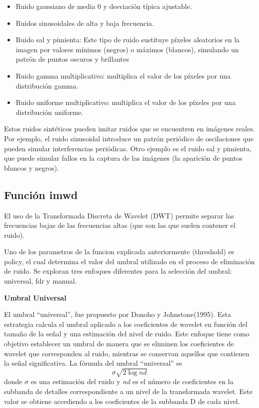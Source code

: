 \documentclass[
]{article}
\providecommand{\tightlist}{%
  \setlength{\itemsep}{0pt}\setlength{\parskip}{0pt}}
\begin{document}
\begin{itemize}
\tightlist
\item
  Ruido gaussiano de media 0 y desviación típica ajustable.
\item
  Ruidos sinusoidales de alta y baja frecuencia.
\item
  Ruido sal y pimienta: Este tipo de ruido sustituye píxeles aleatorios
  en la imagen por valores mínimos (negros) o máximos (blancos),
  simulando un patrón de puntos oscuros y brillantes
\item
  Ruido gamma multiplicativo: multiplica el valor de los píxeles por una
  distribución gamma.
\item
  Ruido uniforme multiplicativo: multiplica el valor de los píxeles por
  una distribución uniforme.
\end{itemize}

Estos ruidos sintéticos pueden imitar ruidos que se encuentren en
imágenes reales. Por ejemplo, el ruido sinusoidal introduce un patrón
periódico de oscilaciones que pueden simular interferencias periódicas.
Otro ejemplo es el ruido sal y pimienta, que puede simular fallos en la
captura de las imágenes (la aparición de puntos blancos y negros).

\subsection{Función imwd}\label{funciuxf3n-imwd}

El uso de la Transformada Discreta de Wavelet (DWT) permite separar las
frecuencias bajas de las frecuencias altas (que son las que suelen
contener el ruido).

Uno de los parametros de la funcion explicada anteriormente (threshold)
es policy, el cual determina el valor del umbral utilizado en el proceso
de eliminación de ruido. Se exploran tres enfoques diferentes para la
selección del umbral: universal, fdr y manual.

\textbf{Umbral Universal}

El umbral ``universal'', fue propuesto por Donoho y Johnstone(1995).
Esta estrategia calcula el umbral aplicado a los coeficientes de wavelet
en función del tamaño de la señal y una estimación del nivel de ruido.
Este enfoque tiene como objetivo establecer un umbral de manera que se
eliminen los coeficientes de wavelet que corresponden al ruido, mientras
se conservan aquellos que contienen la señal significativa. La fórmula
del umbral ``universal'' es \[ \sigma \sqrt{2 \log nd}\] donde
\(\sigma\) es una estimación del ruido y \emph{nd} es el número de
coeficientes en la subbanda de detalles correspondiente a un nivel de la
transformada wavelet. Este valor se obtiene accediendo a los
coeficientes de la subbanda D de cada nivel.
\end{document}
